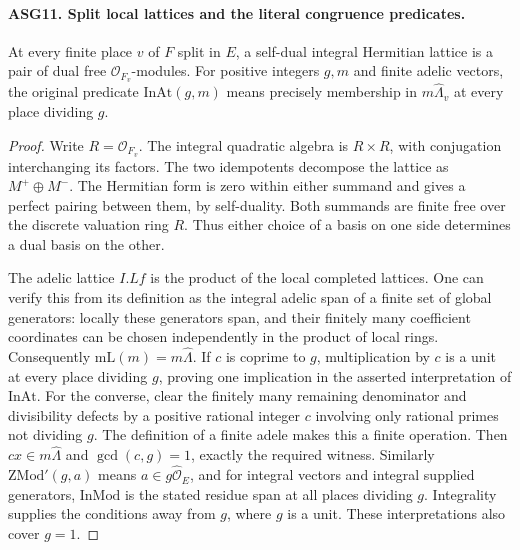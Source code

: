 \documentclass[11pt,a4paper]{article}
\numberwithin{equation}{section}
\theoremstyle{remark}\newtheorem{remark}[theorem]{Remark}
\begin{document}
\paragraph{ASG11. Split local lattices and the literal congruence predicates.}
\label{claim:ASG11}
At every finite place \(v\) of \(F\) split in \(E\), a
self-dual integral Hermitian lattice is a pair of dual free
\(\mathcal O_{F_v}\)-modules.  For positive integers \(g,m\)
and finite adelic vectors, the original predicate
\(\mathrm{InAt}(g,m)\) means precisely membership
in \(m\widehat\Lambda_v\) at every place dividing \(g\).
\begin{proof}
Write \(R=\mathcal O_{F_v}\).  The integral quadratic algebra
is \(R\times R\), with conjugation interchanging its factors.
The two idempotents decompose the lattice as \(M^+\oplus M^-\).
The Hermitian form is zero within either summand and gives a perfect
pairing between them, by self-duality.  Both summands are finite free
over the discrete valuation ring \(R\).  Thus either choice of a
basis on one side determines a dual basis on the other.

The adelic lattice \(I.Lf\) is the product of the local completed
lattices.  One can verify this from its definition as the integral
adelic span of a finite set of global generators: locally these
generators span, and their finitely many coefficient coordinates can
be chosen independently in the product of local rings.
Consequently \(\mathrm{mL}(m)=m\widehat\Lambda\).
If \(c\) is coprime to \(g\), multiplication by \(c\) is a
unit at every place dividing \(g\), proving one implication in
the asserted interpretation of \(\mathrm{InAt}\).
For the converse, clear the finitely many remaining denominator and
divisibility defects by a positive rational integer \(c\) involving
only rational primes not dividing \(g\).  The definition of a
finite adele makes this a finite operation.  Then
\(c x\in m\widehat\Lambda\) and \(\gcd(c,g)=1\), exactly
the required witness.  Similarly \(\mathrm{ZMod'}(g,a)\)
means \(a\in g\widehat{\mathcal O}_E\), and
for integral vectors and integral supplied generators,
\(\mathrm{InMod}\) is the stated residue span at all places
dividing \(g\).  Integrality supplies the conditions away from
\(g\), where \(g\) is a unit.  These interpretations also
cover \(g=1\).
\end{proof}

\end{document}
